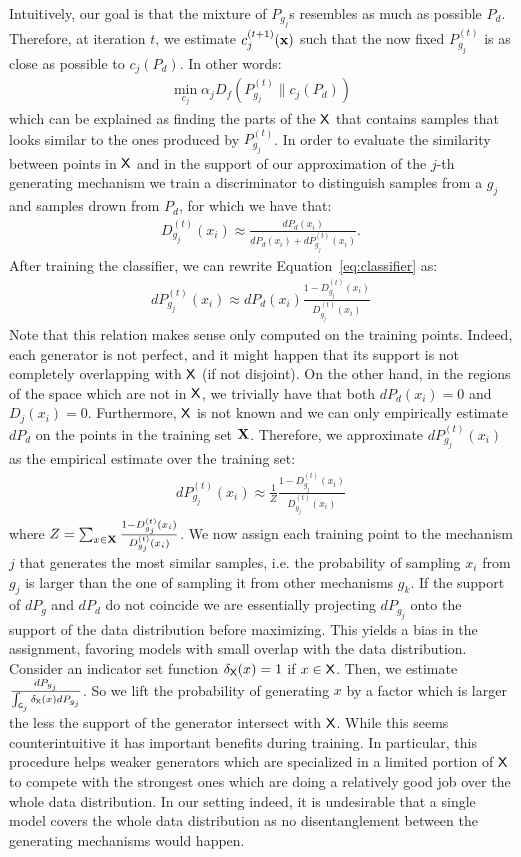 \documentclass{article}
\newcommand{\Pd}{P_{d}}
\begin{document}
Intuitively, our goal is that the mixture of $P_{g_j}$s resembles as much as possible $\Pd$. Therefore, at iteration $t$, we estimate $c_{j}^{(t+1)}({\mathbf{x}})$ such that the now fixed $P_{g_j}^{(t)}$ is as close as possible to $c_j(\Pd)$. In other words:
\begin{align}\label{eq:obj_c}
\min_{c_j} \alpha_j D_f\left(P_{g_j}^{(t)}\|c_j(\Pd)\right)
\end{align}
which can be explained as finding the parts of the $\mathsf{X}$ that contains samples that looks similar to the ones produced by $P_{g_j}^{(t)}$.
In order to evaluate the similarity between points in $\mathsf{X}$ and in the support of our approximation of the $j$-th generating mechanism we train a discriminator to distinguish samples from a $g_j$ and samples drown from $\Pd$, for which we have that:
\begin{align}\label{eq:classifier}
D^{(t)}_{g_j}(x_i) \approx \frac{ d\Pd(x_i)}{  d\Pd(x_i) + dP_{g_j}^{(t)}(x_i)}.
\end{align}
After training the classifier, we can rewrite Equation~\eqref{eq:classifier} as:
\begin{align*}
dP_{g_j}^{(t)}(x_i) \approx d\Pd(x_i)  \frac{1-D^{(t)}_{g_j}(x_i)}{D^{(t)}_{g_j}(x_i)}
\end{align*} 
Note that this relation makes sense only computed on the training points. Indeed, each generator is not perfect, and it might happen that its support is not completely overlapping with $\mathsf{X}$ (if not disjoint).
On the other hand, in the regions of the space which are not in $\mathsf{X}$, we trivially have that both $d\Pd(x_i) = 0$ and $D_j(x_i) = 0$. Furthermore, $\mathsf{X}$ is not known and we can only empirically estimate $d\Pd$ on the points in the training set ${\mathbf{X}}$. Therefore, we approximate $dP_{g_j}^{(t)}(x_i)$ as the empirical estimate over the training set:
\begin{align*}
dP_{g_j}^{(t)}(x_i) \approx \frac{1}{Z}  \frac{1-D^{(t)}_{g_j}(x_i)}{D^{(t)}_{g_j}(x_i)}
\end{align*}
where $Z = \sum_{x\in{\mathbf{X}}} \frac{1-D^{(t)}_{g_j}(x_i)}{D^{(t)}_{g_j}(x_i)}$.
We now assign each training point to the mechanism $j$ that generates the most similar samples, i.e. the probability of sampling $x_i$ from $g_j$ is larger than the one of sampling it from other mechanisms $g_{k}$. If the support of $dP_g$ and $d\Pd$ do not coincide we are essentially projecting $dP_{g_j}$ onto the support of the data distribution before maximizing. This yields a bias in the assignment, favoring models with small overlap with the data distribution. Consider an indicator set function $\delta_{\mathsf{X}}(x) = 1$ if $x\in\mathsf{X}$. Then, we estimate $\frac{dP_{g_j}}{\int_{\mathsf{G}_j} \delta_{\mathsf{X}}(x) dP_{g_j}}$. So we lift the probability of generating $x$ by a factor which is larger the less the support of the generator intersect with $\mathsf{X}$. While this seems counterintuitive it has important benefits during training. In particular, this procedure helps weaker generators which are specialized in a limited portion of $\mathsf{X}$ to compete with the strongest ones which are doing a relatively good job over the whole data distribution. In our setting indeed, it is undesirable that a single model covers the whole data distribution as no disentanglement between the generating mechanisms would happen.
\end{document}
